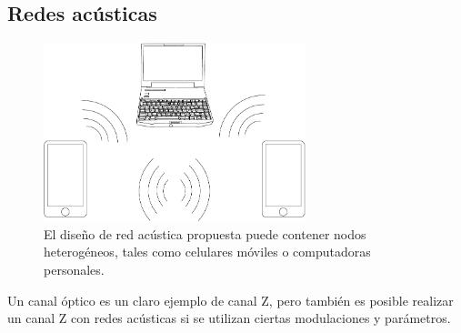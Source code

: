
\subsection{Redes acústicas}
\begin{figure}[!t]
  \centering
    \includegraphics[width=3in]{graphs/compucelus.pdf}
    \caption{El diseño de red acústica propuesta puede contener nodos heterogéneos, tales como celulares móviles o computadoras personales.}
    \label{arch:chain}
\end{figure}

Un canal óptico es un claro ejemplo de canal Z, pero también es posible realizar un canal Z con redes acústicas si se utilizan ciertas modulaciones y parámetros.

